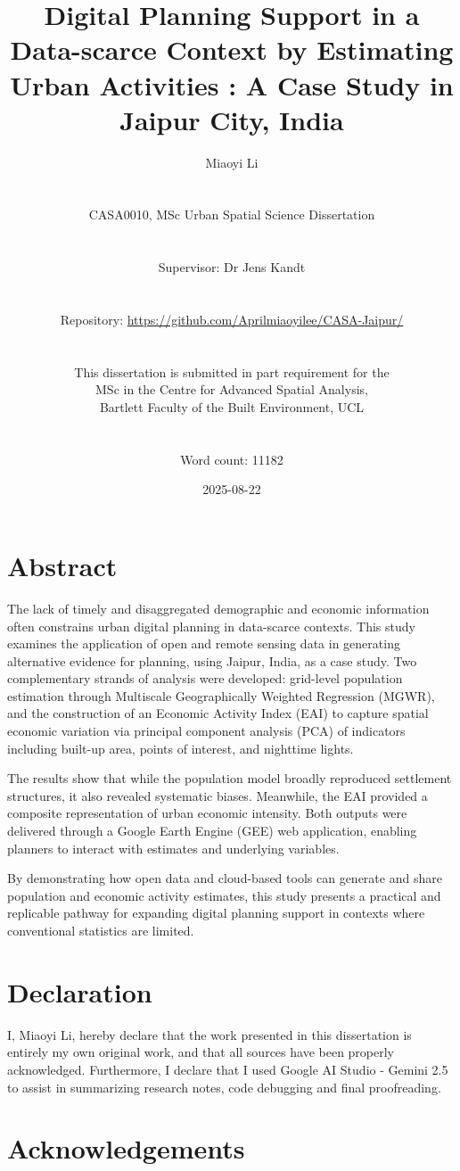 \documentclass[
  12pt,
  oneside]{book}
\title{Digital Planning Support in a Data-scarce Context by Estimating Urban Activities : A Case Study in Jaipur City, India}
\author{Miaoyi Li\\
\strut \\
CASA0010, MSc Urban Spatial Science Dissertation\\
\strut \\
Supervisor: Dr Jens Kandt\\
\strut \\
Repository: \url{https://github.com/Aprilmiaoyilee/CASA-Jaipur/}\\
\strut \\
This dissertation is submitted in part requirement for the\\
MSc in the Centre for Advanced Spatial Analysis,\\
Bartlett Faculty of the Built Environment, UCL\\
\strut \\
Word count: 11182}
\date{2025-08-22}
\begin{document}
\maketitle


\chapter*{Abstract}\label{abstract}

The lack of timely and disaggregated demographic and economic information often constrains urban digital planning in data-scarce contexts. This study examines the application of open and remote sensing data in generating alternative evidence for planning, using Jaipur, India, as a case study. Two complementary strands of analysis were developed: grid-level population estimation through Multiscale Geographically Weighted Regression (MGWR), and the construction of an Economic Activity Index (EAI) to capture spatial economic variation via principal component analysis (PCA) of indicators including built-up area, points of interest, and nighttime lights.

The results show that while the population model broadly reproduced settlement structures, it also revealed systematic biases. Meanwhile, the EAI provided a composite representation of urban economic intensity. Both outputs were delivered through a Google Earth Engine (GEE) web application, enabling planners to interact with estimates and underlying variables.

By demonstrating how open data and cloud-based tools can generate and share population and economic activity estimates, this study presents a practical and replicable pathway for expanding digital planning support in contexts where conventional statistics are limited.


\chapter*{Declaration}\label{declaration}

I, Miaoyi Li, hereby declare that the work presented in this dissertation is entirely my own original work, and that all sources have been properly acknowledged. Furthermore, I declare that I used Google AI Studio - Gemini 2.5 to assist in summarizing research notes, code debugging and final proofreading.

\chapter*{Acknowledgements}\label{acknowledgements}
\end{document}
